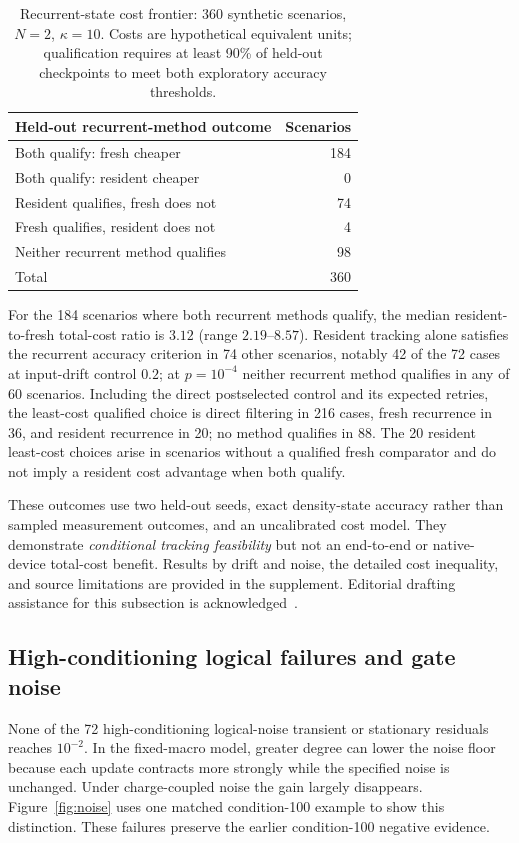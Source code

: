 \documentclass{ieeeaccess}
\begin{document}
\begin{table}[!tbp]\centering
\caption{Recurrent-state cost frontier: 360 synthetic scenarios, $N=2$, $\kappa=10$. Costs are hypothetical equivalent units; qualification requires at least 90\% of held-out checkpoints to meet both exploratory accuracy thresholds.}
\label{tab:costfrontier}
\setlength{\tabcolsep}{4pt}
\begin{tabular}{lr}\toprule
Held-out recurrent-method outcome & Scenarios\\\midrule
Both qualify: fresh cheaper & 184\\
Both qualify: resident cheaper & 0\\
Resident qualifies, fresh does not & 74\\
Fresh qualifies, resident does not & 4\\
Neither recurrent method qualifies & 98\\\midrule
Total & 360\\\bottomrule
\end{tabular}
\end{table}
For the 184 scenarios where both recurrent methods qualify, the median resident-to-fresh total-cost ratio is $3.12$ (range $2.19$--$8.57$). Resident tracking alone satisfies the recurrent accuracy criterion in 74 other scenarios, notably 42 of the 72 cases at input-drift control $0.2$; at $p=10^{-4}$ neither recurrent method qualifies in any of 60 scenarios. Including the direct postselected control and its expected retries, the least-cost qualified choice is direct filtering in 216 cases, fresh recurrence in 36, and resident recurrence in 20; no method qualifies in 88. The 20 resident least-cost choices arise in scenarios without a qualified fresh comparator and do not imply a resident cost advantage when both qualify.

These outcomes use two held-out seeds, exact density-state accuracy rather than sampled measurement outcomes, and an uncalibrated cost model. They demonstrate \emph{conditional tracking feasibility} but not an end-to-end or native-device total-cost benefit. Results by drift and noise, the detailed cost inequality, and source limitations are provided in the supplement. Editorial drafting assistance for this subsection is acknowledged~\cite{openai2026}.

\subsection{High-conditioning logical failures and gate noise}
None of the 72 high-conditioning logical-noise transient or stationary residuals reaches $10^{-2}$. In the fixed-macro model, greater degree can lower the noise floor because each update contracts more strongly while the specified noise is unchanged. Under charge-coupled noise the gain largely disappears. Figure~\ref{fig:noise} uses one matched condition-100 example to show this distinction. These failures preserve the earlier condition-100 negative evidence.
\end{document}
